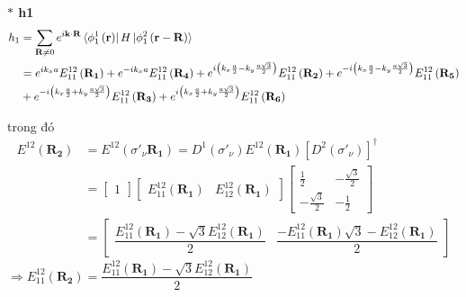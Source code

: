 \documentclass{article}
\begin{document}
\noindent \textbf{ $\ast$ h1}
\begin{align*}
    h_1 & = \sum_{\mathbf{R} \neq 0} e^{i\mathbf{k\cdot R}} \bra*{\phi_1^1 \left(\mathbf{r}\right)} H \ket*{\phi_1^2\left(\mathbf{r}-\mathbf{R}\right)}                                                                                                                                                                       \\
        & = e^{i k_x a} E_{11}^{12}\left(\mathbf{R_1}\right) + e^{-i k_x a} E_{11}^{12}\left(\mathbf{R_4}\right) + e^{i \left( k_x \frac{a}{2} - k_y \frac{a\sqrt{3}}{2} \right)} E_{11}^{12}\left(\mathbf{R_2}\right) + e^{-i \left( k_x \frac{a}{2} - k_y \frac{a\sqrt{3}}{2} \right)} E_{11}^{12}\left(\mathbf{R_5}\right) \\
        & + e^{-i \left( k_x \frac{a}{2} + k_y \frac{a\sqrt{3}}{2} \right)} E_{11}^{12}\left(\mathbf{R_3}\right) + e^{i \left( k_x \frac{a}{2} + k_y \frac{a\sqrt{3}}{2} \right)} E_{11}^{12}\left(\mathbf{R_6}\right)
\end{align*}

trong đó
\begin{align*}
    E^{12}(\mathbf{R_2})
     & = E^{12}(\sigma'_\nu \mathbf{R_1}) = D^1(\sigma'_\nu) E^{12}(\mathbf{R_1}) \left[ D^2(\sigma'_\nu)\right]^\dagger                                                                                                                                                                                                 \\
     & = \begin{bmatrix}
             1
         \end{bmatrix}
    \begin{bmatrix}
        E_{11}^{12}(\mathbf{R_1}) & E_{12}^{12}(\mathbf{R_1})
    \end{bmatrix}
    \begin{bmatrix}
        \frac{1}{2}         & -\frac{\sqrt{3}}{2} \\
        -\frac{\sqrt{3}}{2} & -\frac{1}{2}
    \end{bmatrix}                                                                                                                                                                                                                                                             \\
     & = \begin{bmatrix}
             \dfrac{ E_{11}^{12}(\mathbf{R_1}) - \sqrt{3} E_{12}^{12}(\mathbf{R_1})}{2} & \dfrac{ - E_{11}^{12}(\mathbf{R_1})\sqrt{3} -  E_{12}^{12}(\mathbf{R_1})}{2}
         \end{bmatrix}
\end{align*}
$\Rightarrow E_{11}^{12}(\mathbf{R_2}) =  \dfrac{ E_{11}^{12}(\mathbf{R_1}) - \sqrt{3} E_{12}^{12}(\mathbf{R_1})}{2} $
\end{document}
